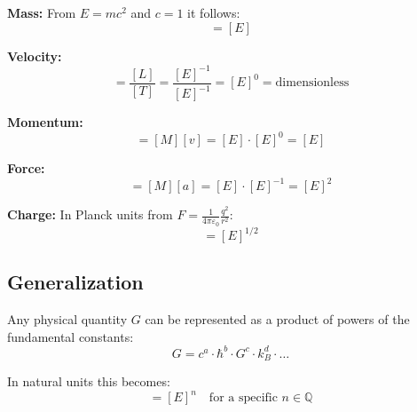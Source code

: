 \documentclass[11pt,a4paper]{article}
\begin{document}
	\textbf{Mass:} From $E = mc^2$ and $c = 1$ it follows:
	\begin{equation}
		[M] = [E]
	\end{equation}
	
	\textbf{Velocity:} 
	\begin{equation}
		[v] = \frac{[L]}{[T]} = \frac{[E]^{-1}}{[E]^{-1}} = [E]^0 = \text{dimensionless}
	\end{equation}
	
	\textbf{Momentum:}
	\begin{equation}
		[p] = [M][v] = [E] \cdot [E]^0 = [E]
	\end{equation}
	
	\textbf{Force:}
	\begin{equation}
		[F] = [M][a] = [E] \cdot [E]^{-1} = [E]^2
	\end{equation}
	
	\textbf{Charge:} In Planck units from $F = \frac{1}{4\pi\varepsilon_0} \frac{q^2}{r^2}$:
	\begin{equation}
		[q] = [E]^{1/2}
	\end{equation}
	
	\subsection{Generalization}
	
	Any physical quantity $G$ can be represented as a product of powers of the fundamental constants:
	\begin{equation}
		G = c^a \cdot \hbar^b \cdot G^c \cdot k_B^d \cdot \ldots
	\end{equation}
	
	In natural units this becomes:
	\begin{equation}
		[G] = [E]^n \quad \text{for a specific } n \in \mathbb{Q}
	\end{equation}
	
\end{document}
